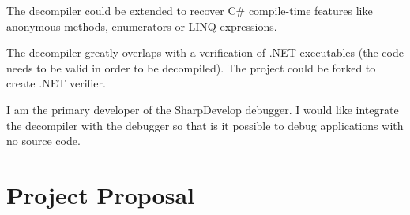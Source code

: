 \documentclass[12pt,twoside,notitlepage]{report}
\begin{document}
The decompiler could be extended to recover C\# compile-time
features like anonymous methods, enumerators or LINQ expressions.

The decompiler greatly overlaps with a verification of .NET executables
(the code needs to be valid in order to be decompiled).
The project could be forked to create .NET verifier.

I am the primary developer of the SharpDevelop debugger.
I would like integrate the decompiler with the debugger so
that is it possible to debug applications with no source code.


\cleardoublepage
\chapter{Project Proposal}

\end{document}
